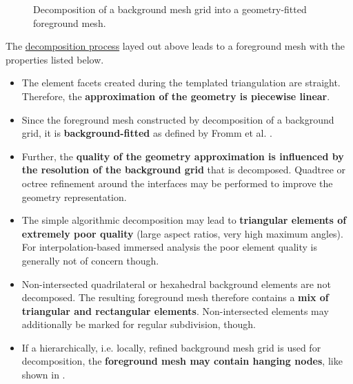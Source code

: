 \begin{figure}[h]
    \vspace{0.2cm}
    \begin{center}
    
    \caption{Decomposition of a background mesh grid into a geometry-fitted foreground mesh.} 
    \label{fig:decomposition}
    \end{center}
\end{figure}

\vspace{0.5cm}

The \hyperlink{decomposition}{decomposition process} layed out above leads to a foreground mesh with the \hypertarget{foreground_mesh_properties}{properties} listed below.
\begin{itemize}
    \item The element facets created during the templated triangulation are straight. Therefore, the \textbf{approximation of the geometry is piecewise linear}.
    
    \item Since the foreground mesh constructed by decomposition of a background grid, it is \textbf{background-fitted} as defined by Fromm et al. \cite{Fromm2022}.
    
    \item Further, the \textbf{quality of the geometry approximation is influenced by the resolution of the background grid} that is decomposed. Quadtree or octree refinement around the interfaces may be performed to improve the geometry representation.
    
    \item The simple algorithmic decomposition may lead to \textbf{triangular elements of extremely poor quality} (large aspect ratios, very high maximum angles). For interpolation-based immersed analysis the poor element quality is generally not of concern though.

    \item Non-intersected quadrilateral or hexahedral background elements are not decomposed. The resulting foreground mesh therefore contains a \textbf{mix of triangular and rectangular elements}. Non-intersected elements may additionally be marked for regular subdivision, though.

    \item If a hierarchically, i.e. locally, refined background mesh grid is used for decomposition, the \textbf{foreground mesh may contain hanging nodes}, like shown in .
\end{itemize}

